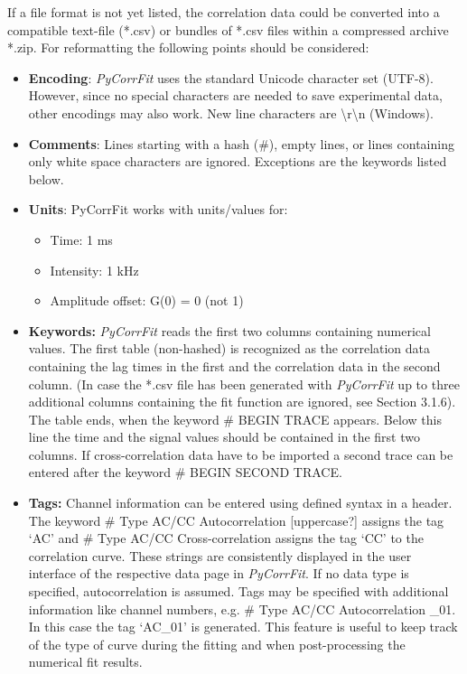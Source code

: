 If a file format is not yet listed, the correlation data could be converted into a compatible text-file (*.csv) or bundles of *.csv files within a compressed archive *.zip. For reformatting the following points should be considered:


\begin{itemize}
\item \textbf{Encoding}: \textit{PyCorrFit} uses the standard Unicode character set (UTF-8). However, since no special characters are needed to save experimental data, other encodings may also work. New line characters are {\textbackslash}r{\textbackslash}n (Windows).
\item \textbf{Comments}: Lines starting with a hash (\#), empty lines, or lines containing only white space characters are ignored. Exceptions are the keywords listed below.
\item \textbf{Units}: PyCorrFit works with units/values for:

\begin{itemize}
\item Time: 1 ms
\item Intensity: 1 kHz
\item Amplitude offset: G(0) = 0 (not 1)
\end{itemize}
\item \textbf{Keywords: }\textit{PyCorrFit} reads the first two columns containing numerical values. The first table (non-hashed) is recognized as the correlation data containing the lag times in the first and the correlation data in the second column. (In case the *.csv file has been generated with \textit{PyCorrFit} up to three additional columns containing the fit function are ignored, see Section 3.1.6). The table ends, when the keyword \# BEGIN TRACE appears. Below this line the time and the signal values should be contained in the first two columns. If cross-correlation data have to be imported a second trace can be entered after the keyword \# BEGIN SECOND TRACE.
\item \textbf{Tags:} Channel information can be entered using defined syntax in a header. The keyword \# Type AC/CC Autocorrelation [uppercase?] assigns the tag ‘AC’ and \# Type AC/CC Cross-correlation assigns the tag ‘CC’ to the correlation curve. These strings are consistently displayed in the user interface of the respective data page in \textit{PyCorrFit}. If no data type is specified, autocorrelation is assumed. Tags may be specified with additional information like channel numbers, e.g. \# Type AC/CC Autocorrelation \_01. In this case the tag ‘AC\_01’ is generated. This feature is useful to keep track of the type of curve during the fitting and when post-processing the numerical fit results.
\end{itemize}

